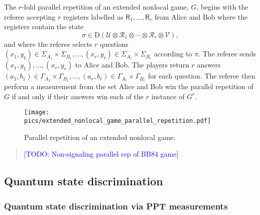 \documentclass[nofootinbib,superscriptaddress,a4paper,twocolumn,longbibliography,floatfix,pra]{revtex4-2}
\newcommand{\comment}[1]{\begin{quote}\sf 
    \textcolor{blue}{[#1]}\end{quote}}
\newcommand{\setft}[1]{\mathrm{#1}}
\newcommand{\Density}{\setft{D}}
\newcommand{\V}{\mathcal{V}}
\newcommand{\U}{\mathcal{U}}
\newcommand{\R}{\mathcal{R}}
\newcommand{\reg}[1]{\textsf{#1}}
\begin{document}
The $r$-fold parallel repetition of an extended nonlocal game, $G$, begins with
the referee accepting $r$ registers labelled as $\reg{R}_1, \ldots, \reg{R}_r$
from Alice and Bob where the registers contain the state
\begin{equation}
    \sigma \in \Density(\U \otimes \R_1 \otimes \cdots \otimes \R_r \otimes \V),
\end{equation}
and where the referee selects $r$ questions $(x_1, y_1) \in \Sigma_{A_1} \times
\Sigma_{B_1}, \ldots, (x_r, y_r) \in \Sigma_{A_r} \times \Sigma_{B_r}$
according to $\pi$. The referee sends $(x_1, y_1), \ldots, (x_r, y_r)$ to Alice
and Bob. The players return $r$ answers $(a_1, b_1) \in \Gamma_{A_1} \times
\Gamma_{B_1}, \ldots, (a_r, b_r) \in \Gamma_{A_r} \times \Gamma_{B_r}$ for each
question. The referee then perform a measurement from the set
Alice and Bob win the parallel repetition of $G$ if and only if their answers
win each of the $r$ instance of $G^r$.

\begin{figure}[!htpb]
    \centering
    \texttt{[image: pics/extended\_nonlocal\_game\_parallel\_repetition.pdf]}
    \caption{Parallel repetition of an extended nonlocal game.}
    \label{fig:extended_nonlocal_game_parallel_repetition}
\end{figure}

\comment{TODO: Non-signaling parallel rep of BB84 game}


\subsection{Quantum state discrimination}
\label{sec:quantum_state_discrimination}



\subsubsection{Quantum state discrimination via PPT measurements}
\label{sec:}
\end{document}
